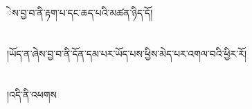 ེས་བྱ་བ་ནི་རྟག་པ་དང་ཆད་པའི་མཚན་ཉིད་དོ།\chapter{ }།ཡོད་ན་ཞེས་བྱ་བ་ནི་དོན་དམ་པར་ཡོད་པས་ཕྱིས་མེད་པར་འགལ་བའི་ཕྱིར་རོ།\chapter{ }།འདི་ནི་འཕགས